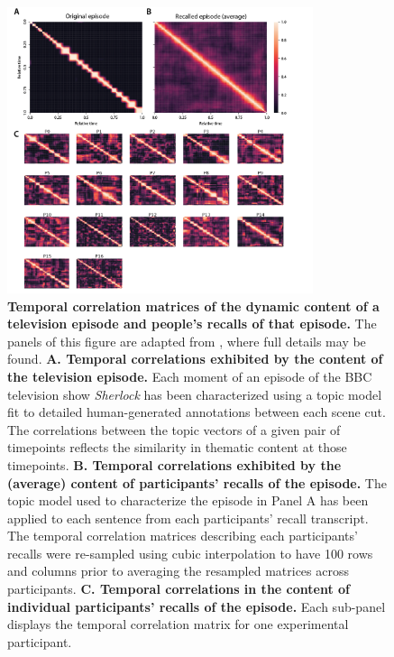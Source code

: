\documentclass{article}
\begin{document}
\begin{figure}[tp] \centering \includegraphics[width=0.8\textwidth]{figs/pres_rec_corrmats_sherlock.png} \caption{\textbf{Temporal correlation matrices of the dynamic content of a television episode and people's recalls of that episode.}  The panels of this figure are adapted from \cite{HeusEtal18c}, where full details may be found. \textbf{A. Temporal correlations exhibited by the content of the television episode.}  Each moment of an episode of the BBC television show \textit{Sherlock} has been characterized using a topic model~\citep{BleiEtal03} fit to detailed human-generated annotations between each scene cut.  The correlations between the topic vectors of a given pair of timepoints reflects the similarity in thematic content at those timepoints.  \textbf{B. Temporal correlations exhibited by the (average) content of participants' recalls of the episode.} The topic model used to characterize the episode in Panel A has been applied to each sentence from each participants' recall transcript.  The temporal correlation matrices describing each participants' recalls were re-sampled using cubic interpolation to have 100 rows and columns prior to averaging the resampled matrices across participants.  \textbf{C. Temporal correlations in the content of individual participants' recalls of the episode.} Each sub-panel displays the temporal correlation matrix for one experimental participant.}
\label{fig:corrmats}
\end{figure}
\end{document}
